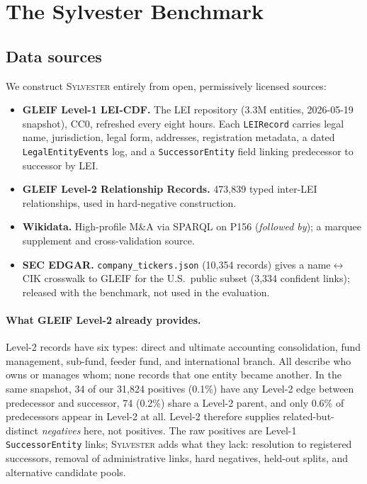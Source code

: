 \documentclass[sigconf]{acmart}
\begin{document}
\section{The Sylvester Benchmark}
\label{sec:benchmark}

\subsection{Data sources}
\label{ssec:sources}

We construct \textsc{Sylvester} entirely from open, permissively licensed
sources:

\begin{itemize}
  \item \textbf{GLEIF Level-1 LEI-CDF.} The LEI repository (3.3M
        entities, 2026-05-19 snapshot), CC0, refreshed every eight
        hours. Each \texttt{LEIRecord} carries legal name,
        jurisdiction, legal form, addresses, registration metadata, a
        dated \texttt{LegalEntityEvents} log, and a
        \texttt{SuccessorEntity} field linking predecessor to
        successor by LEI.

  \item \textbf{GLEIF Level-2 Relationship Records.} 473{,}839 typed
        inter-LEI relationships, used in hard-negative construction.

  \item \textbf{Wikidata.} High-profile M\&A via SPARQL on P156
        (\emph{followed by}); a marquee supplement and
        cross-validation source.

  \item \textbf{SEC EDGAR.} \texttt{company\_tickers.json} (10{,}354
        records) gives a name$\leftrightarrow$CIK crosswalk to GLEIF
        for the U.S.\ public subset (3{,}334 confident links);
        released with the benchmark, not used in the evaluation.
\end{itemize}

\paragraph{What GLEIF Level-2 already provides.} Level-2 records
have six types: direct and ultimate accounting consolidation, fund
management, sub-fund, feeder fund, and international branch. All
describe who owns or manages whom; none records that one entity
became another. In the same snapshot, 34 of our 31{,}824 positives
(0.1\%) have any Level-2 edge between predecessor and successor, 74
(0.2\%) share a Level-2 parent, and only 0.6\% of predecessors
appear in Level-2 at all. Level-2 therefore supplies
related-but-distinct \emph{negatives} here, not positives. The raw
positives are Level-1 \texttt{SuccessorEntity} links;
\textsc{Sylvester} adds what they lack: resolution to registered
successors, removal of administrative links, hard negatives,
held-out splits, and alternative candidate pools.
\end{document}
